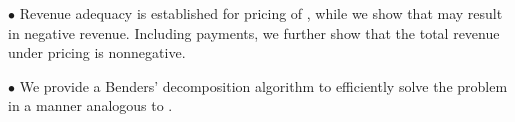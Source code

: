     \noindent $\bullet$ Revenue adequacy is established for  \LMPmar{} pricing of \RSCED{}, while we show that \LMPnom{} may result in negative revenue. Including \LOC{} payments, we further show that the total revenue under \LMPmar{} pricing is nonnegative. 

    \noindent $\bullet$ We provide a Benders' decomposition algorithm to efficiently solve the \RSCED{} problem in a manner analogous to . 




